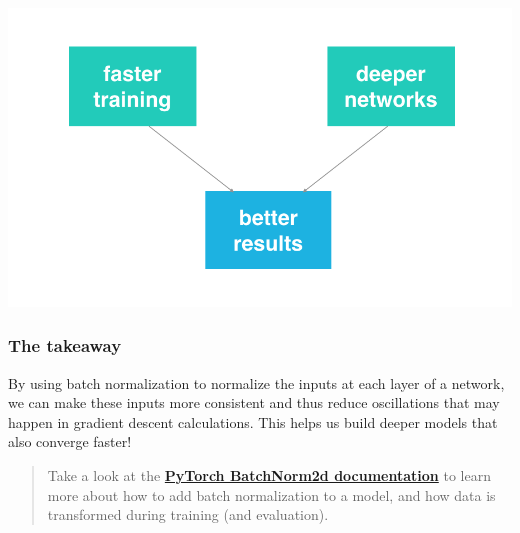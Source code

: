 \includegraphics[width=0.5\linewidth]{img//genAdvNet//deepGAN/screen-shot-2018-11-07-at-4.53.24-pm.png}

\subsubsection{The takeaway}
By using batch normalization to normalize the inputs at each layer of a network, we can make these inputs more consistent and thus reduce oscillations that may happen in gradient descent calculations. This helps us build deeper models that also converge faster!
\begin{quote}
Take a look at the \href{https://pytorch.org/docs/stable/nn.html\#batchnorm2d}{\textbf{PyTorch BatchNorm2d documentation}} to learn more about how to add batch normalization to a model, and how data is transformed during training (and evaluation).

\end{quote}
